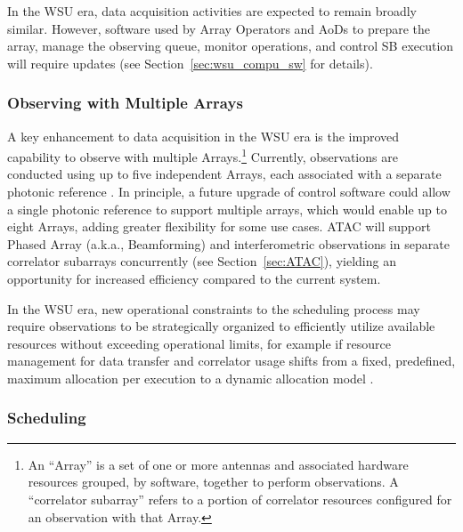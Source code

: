 In the WSU era, data acquisition activities are expected to remain broadly similar. However, software used by Array Operators and \acp{AoD} to prepare the array, manage the observing queue, monitor operations, and control \ac{SB} execution  will require updates (see Section~\ref{sec:wsu_compu_sw} for details).


\subsubsection{Observing with Multiple Arrays}
\label{sec:da-multiple-arrays}
A key enhancement to data acquisition in the WSU era is the improved capability to observe with multiple Arrays.\footnote{An ``Array'' is a set of one or more antennas and associated hardware resources grouped, by software, together to perform observations. A ``correlator subarray'' refers to a portion of correlator resources configured for an observation with that Array.} Currently, observations are conducted using up to five independent Arrays, each associated with a separate photonic reference \cite{CSA-IA}. 
In principle, a future upgrade of control software could allow a single photonic reference to support multiple arrays, which would enable up to eight Arrays, adding greater flexibility for some use cases. \ac{ATAC} will support Phased Array (a.k.a., Beamforming) and interferometric observations in separate correlator subarrays concurrently (see Section~\ref{sec:ATAC}), yielding an opportunity for increased efficiency compared to the current system. 


In the WSU era, new operational constraints to the scheduling process may require observations to be strategically organized to efficiently utilize available resources without exceeding operational limits, for example if resource management for data transfer and correlator usage shifts from a fixed, predefined, maximum allocation per execution to a dynamic allocation model \cite{sys_reqs}.

\subsubsection{Scheduling}
\label{sec:scheduling}

